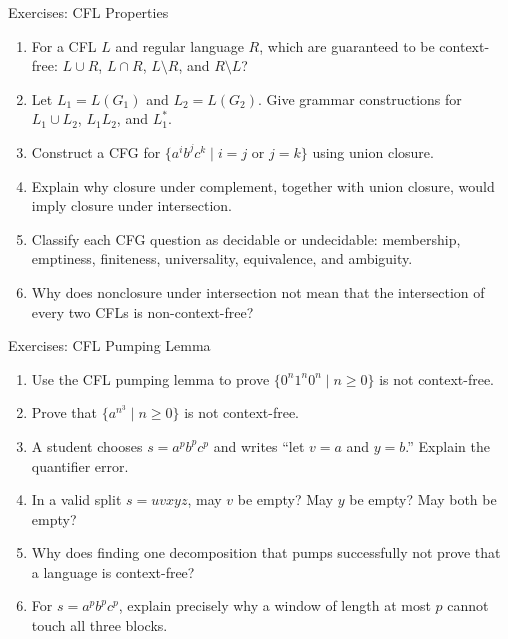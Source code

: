\documentclass[10pt]{beamer}
\begin{document}
\begin{frame}{Exercises: CFL Properties}
  \small
  \begin{enumerate}
    \item For a CFL $L$ and regular language $R$, which are guaranteed to be context-free:
      $L\cup R$, $L\cap R$, $L\setminus R$, and $R\setminus L$?
    \item Let $L_1=L(G_1)$ and $L_2=L(G_2)$. Give grammar constructions for
      $L_1\cup L_2$, $L_1L_2$, and $L_1^*$.
    \item Construct a CFG for
      $\{a^i b^j c^k\mid i=j\text{ or }j=k\}$ using union closure.
    \item Explain why closure under complement, together with union closure, would imply closure under intersection.
    \item Classify each CFG question as decidable or undecidable: membership, emptiness, finiteness,
      universality, equivalence, and ambiguity.
    \item Why does nonclosure under intersection not mean that the intersection of every two CFLs is non-context-free?
  \end{enumerate}
\end{frame}

\begin{frame}{Exercises: CFL Pumping Lemma}
  \small
  \begin{enumerate}
    \item Use the CFL pumping lemma to prove
      $\{0^n1^n0^n\mid n\ge0\}$ is not context-free.
    \item Prove that $\{a^{n^3}\mid n\ge0\}$ is not context-free.
    \item A student chooses $s=a^p b^p c^p$ and writes ``let $v=a$ and $y=b$.''
      Explain the quantifier error.
    \item In a valid split $s=uvxyz$, may $v$ be empty? May $y$ be empty? May both be empty?
    \item Why does finding one decomposition that pumps successfully not prove that a language is context-free?
    \item For $s=a^p b^p c^p$, explain precisely why a window of length at most $p$ cannot touch all three blocks.
  \end{enumerate}
\end{frame}
\end{document}
